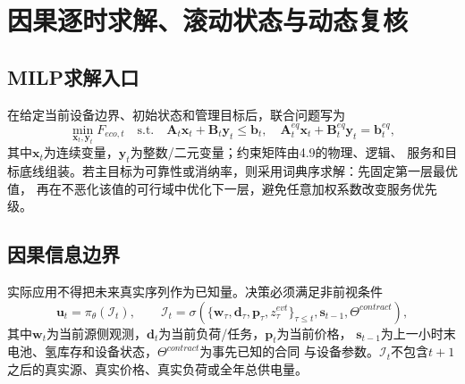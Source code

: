 \section{因果逐时求解、滚动状态与动态复核}
\label{sec:solution}

\subsection{MILP求解入口}

在给定当前设备边界、初始状态和管理目标后，联合问题写为
\begin{equation}
\min_{\bm x_t,\bm y_t} F_{eco,t}
\quad\mathrm{s.t.}\quad
\bm A_t\bm x_t+\bm B_t\bm y_t\le\bm b_t,
\quad
\bm A_t^{eq}\bm x_t+\bm B_t^{eq}\bm y_t=\bm b_t^{eq},
\label{eq:milp-compact}
\end{equation}
其中$\bm x_t$为连续变量，$\bm y_t$为整数/二元变量；约束矩阵由4.9的物理、逻辑、
服务和目标底线组装。若主目标为可靠性或消纳率，则采用词典序求解：先固定第一层最优值，
再在不恶化该值的可行域中优化下一层，避免任意加权系数改变服务优先级。

\subsection{因果信息边界}

实际应用不得把未来真实序列作为已知量。决策必须满足非前视条件
\begin{equation}
\bm u_t=\pi_\theta(\mathcal I_t),\qquad
\mathcal I_t=\sigma\!\left(
\{\bm w_\tau,\bm d_\tau,\bm p_\tau,z_\tau^{evt}\}_{\tau\le t},
\bm s_{t-1},\Theta^{contract}\right),
\label{eq:causal-policy}
\end{equation}
其中$\bm w_t$为当前源侧观测，$\bm d_t$为当前负荷/任务，$\bm p_t$为当前价格，
$\bm s_{t-1}$为上一小时末电池、氢库存和设备状态，$\Theta^{contract}$为事先已知的合同
与设备参数。$\mathcal I_t$不包含$t+1$之后的真实源、真实价格、真实负荷或全年总供电量。

